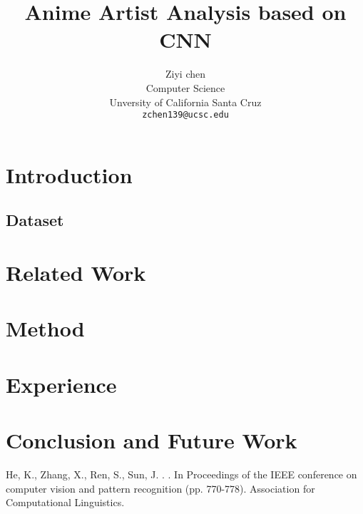 \documentclass[11pt]{article}
\title{Anime Artist Analysis based on CNN}
\author{Ziyi chen \\
  Computer Science  \\
  Unversity of California Santa Cruz\\
  {\tt zchen139@ucsc.edu}}
\date{}
\begin{document}
\maketitle
\begin{abstract}


\end{abstract}

\section{Introduction}

\subsection{Dataset}

\section{Related Work}

\section{Method}

\section{Experience}

\section{Conclusion and  Future Work}






%
%

\begin{thebibliography}{}
He, K., Zhang, X., Ren, S., Sun, J.
.
.
\newblock In Proceedings of the IEEE conference on computer vision and pattern recognition (pp. 770-778).
\newblock Association for Computational Linguistics.





\end{thebibliography}
\end{document}
